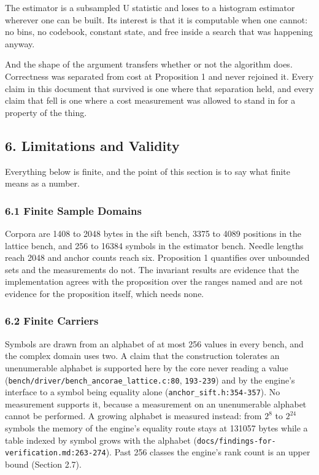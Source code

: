 The estimator is a subsampled U statistic and loses to a histogram estimator wherever one can be built. Its interest is that it is computable when one cannot: no bins, no codebook, constant state, and free inside a search that was happening anyway.

And the shape of the argument transfers whether or not the algorithm does. Correctness was separated from cost at Proposition 1 and never rejoined it. Every claim in this document that survived is one where that separation held, and every claim that fell is one where a cost measurement was allowed to stand in for a property of the thing.

\subsection{6. Limitations and Validity}

Everything below is finite, and the point of this section is to say what finite means as a number.

\subsubsection{6.1 Finite Sample Domains}

Corpora are 1408 to 2048 bytes in the sift bench, 3375 to 4089 positions in the lattice bench, and 256 to 16384 symbols in the estimator bench. Needle lengths reach 2048 and anchor counts reach six. Proposition 1 quantifies over unbounded sets and the measurements do not. The invariant results are evidence that the implementation agrees with the proposition over the ranges named and are not evidence for the proposition itself, which needs none.

\subsubsection{6.2 Finite Carriers}

Symbols are drawn from an alphabet of at most 256 values in every bench, and the complex domain uses two. A claim that the construction tolerates an unenumerable alphabet is supported here by the core never reading a value (\texttt{bench/\allowbreak{}driver/\allowbreak{}bench\_\allowbreak{}ancorae\_\allowbreak{}lattice.\allowbreak{}c:80}, \texttt{193-\allowbreak{}239}) and by the engine's interface to a symbol being equality alone (\texttt{anchor\_sift.h:354-357}). No measurement supports it, because a measurement on an unenumerable alphabet cannot be performed. A growing alphabet is measured instead: from \(2^8\) to \(2^{24}\) symbols the memory of the engine's equality route stays at 131057 bytes while a table indexed by symbol grows with the alphabet (\texttt{docs/\allowbreak{}findings-\allowbreak{}for-\allowbreak{}verification.md:263-\allowbreak{}274}). Past 256 classes the engine's rank count is an upper bound (Section 2.7).


